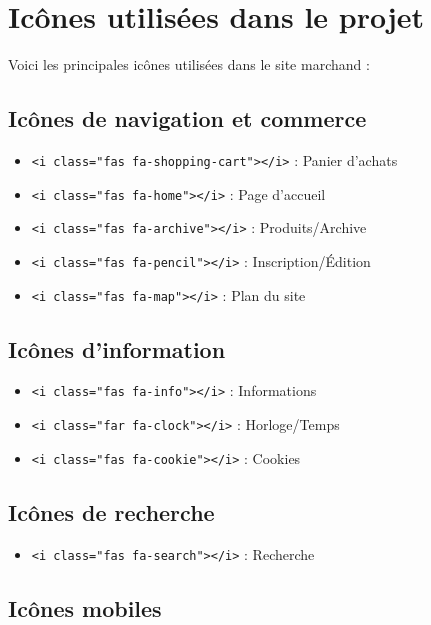 \documentclass[12pt,a4paper]{article}
\begin{document}
\section{Icônes utilisées dans le projet}

Voici les principales icônes utilisées dans le site marchand :

\subsection{Icônes de navigation et commerce}

\begin{itemize}
\item \faShoppingCart{} \texttt{<i class="fas fa-shopping-cart"></i>} : Panier d'achats
\item \faHome{} \texttt{<i class="fas fa-home"></i>} : Page d'accueil
\item \faArchive{} \texttt{<i class="fas fa-archive"></i>} : Produits/Archive
\item \faPencil{} \texttt{<i class="fas fa-pencil"></i>} : Inscription/Édition
\item \faMap{} \texttt{<i class="fas fa-map"></i>} : Plan du site
\end{itemize}

\subsection{Icônes d'information}

\begin{itemize}
\item \faInfo{} \texttt{<i class="fas fa-info"></i>} : Informations
\item \faClockO{} \texttt{<i class="far fa-clock"></i>} : Horloge/Temps
\item \faCookie{} \texttt{<i class="fas fa-cookie"></i>} : Cookies
\end{itemize}

\subsection{Icônes de recherche}

\begin{itemize}
\item \faSearch{} \texttt{<i class="fas fa-search"></i>} : Recherche
\end{itemize}

\subsection{Icônes mobiles}
\end{document}
